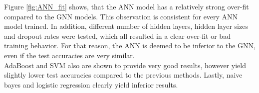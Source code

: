   \noindent Figure \ref{fig:ANN_fit} shows, that the ANN model has a relatively
  strong over-fit compared to the GNN models. This observation is consistent
  for every ANN model trained. In addition, different number of hidden layers, 
  hidden layer sizes and dropout rates were tested, which all resulted in a 
  clear over-fit or bad training behavior. For that reason, the ANN is deemed
  to be inferior to the GNN, even if the test accuracies are very similar. \\

  \noindent AdaBoost and SVM also are shown to provide very good results,
  however yield slightly lower test accuracies compared to the previous
  methods. Lastly, naive bayes and logistic regression clearly yield inferior
  results. 
